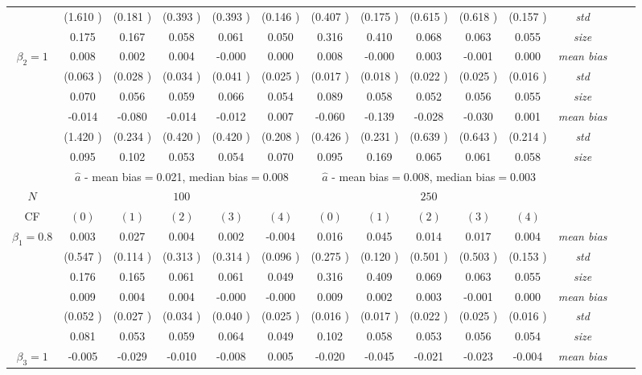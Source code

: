 \begin{table}
\begin{threeparttable}
{\begin{tabular}{|c|c|c|c|c|c|c|c|c|c|c|c|c|c|}
&(1.610 )&(0.181 )&(0.393 )&(0.393 )&(0.146 )&(0.407 )&(0.175 )&(0.615 )&(0.618 )&(0.157 )&\textit{std}\\ 
& 0.175 & 0.167 &0.058 &0.061 &0.050 &0.316& 0.410 &0.068 &0.063& 0.055 &\textit{size} \\ \midrule 
\multirow{4}{*}{$\beta_2=1$}& 0.008 & 0.002 &0.004 &-0.000 &0.000 &0.008& -0.000 &0.003 &-0.001& 0.000 &\textit{mean bias} \\ 
&(0.063 )&(0.028 )&(0.034 )&(0.041 )&(0.025 )&(0.017 )&(0.018 )&(0.022 )&(0.025 )&(0.016 )&\textit{std}\\ 
& 0.070 & 0.056 &0.059 &0.066 &0.054 &0.089& 0.058 &0.052& 0.056 &0.055 &\textit{size} \\\midrule 
\multirow{4}{*}{$\beta_3=1$}& -0.014 & -0.080 &-0.014& -0.012 &0.007 &-0.060 &-0.139 &-0.028 &-0.030& 0.001 &\textit{mean bias} \\ 
&(1.420 )&(0.234 )&(0.420 )&(0.420 )&(0.208 )&(0.426 )&(0.231 )&(0.639 )&(0.643 )&(0.214 )&\textit{std}\\ 
& 0.095 & 0.102 &0.053 &0.054 &0.070 &0.095& 0.169& 0.065 &0.061 &0.058 &\textit{size} \\\midrule 
&\multicolumn{5}{|c|}{$\hat{a}$ - mean bias$=$0.021, median bias$=$0.008 }&\multicolumn{5}{|c|}{$\hat{a}$ - mean bias$=$0.008, median bias$=$0.003 }&\\ \hline 
\cellcolor{yellow}$N$&\multicolumn{5}{|c|}{\cellcolor{yellow}$100$}&\multicolumn{5}{|c|}{\cellcolor{yellow}$250$}&\\\hline 
CF&$(0)$&$(1)$&$(2)$&$(3)$&$(4)$& $(0)$ &$(1)$&$(2)$&$(3)$&$(4)$&\\\hline 
\multirow{4}{*}{$\beta_1=0.8$}& 0.003 & 0.027 &0.004 &0.002 &-0.004 &0.016& 0.045 &0.014 &0.017& 0.004 &\textit{mean bias} \\ 
&(0.547 )&(0.114 )&(0.313 )&(0.314 )&(0.096 )&(0.275 )&(0.120 )&(0.501 )&(0.503 )&(0.153 )&\textit{std}\\ 
& 0.176 & 0.165 &0.061 &0.061 &0.049 &0.316& 0.409 &0.069 &0.063& 0.055 &\textit{size} \\\midrule 
\multirow{4}{*}{$\beta_2=1$}& 0.009 & 0.004 &0.004 &-0.000 &-0.000 &0.009& 0.002 &0.003 &-0.001& 0.000 &\textit{mean bias} \\ 
&(0.052 )&(0.027 )&(0.034 )&(0.040 )&(0.025 )&(0.016 )&(0.017 )&(0.022 )&(0.025 )&(0.016 )&\textit{std}\\ 
& 0.081 & 0.053 &0.059 &0.064 &0.049 &0.102& 0.058 &0.053& 0.056 &0.054 &\textit{size} \\ \midrule
\multirow{4}{*}{$\beta_3=1$}& -0.005 & -0.029 &-0.010& -0.008 &0.005 &-0.020 &-0.045 &-0.021 &-0.023& -0.004 &\textit{mean bias} \\ 

\end{tabular}}
\end{threeparttable}
\end{table}
